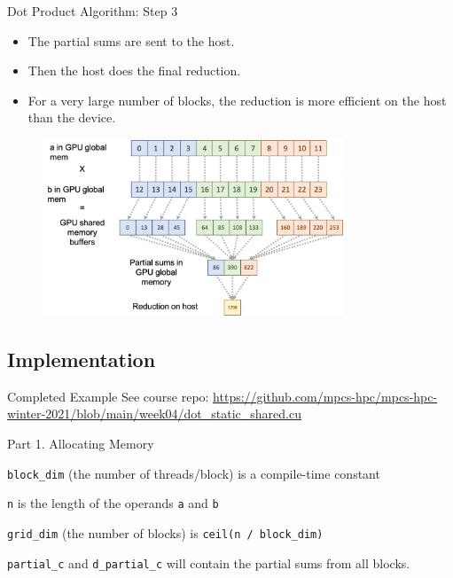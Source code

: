 \documentclass{beamer}
\begin{document}
    \begin{frame}{Dot Product Algorithm: Step 3}
        \begin{itemize}
            \item The partial sums are sent to the host.
            \item Then the host does the final reduction.
            \item For a very large number of blocks, the reduction is more efficient on the host than the device.
        \end{itemize}
        \begin{figure}
            \centering
            \includegraphics[width=0.8\textwidth]{img/04/dot-03.png}
        \end{figure}
    \end{frame}
    
    \subsection{Implementation}

    \begin{frame}{Completed Example}
        See course repo:  \url{https://github.com/mpcs-hpc/mpcs-hpc-winter-2021/blob/main/week04/dot_static_shared.cu}
    \end{frame}

    \begin{frame}{Part 1. Allocating Memory}
            \begin{itemize}
            {\footnotesize
                \item \texttt{block\_dim} (the number of threads/block) is a compile-time constant
                \item \texttt{n} is the length of the operands \texttt{a} and \texttt{b}
                \item \texttt{grid\_dim} (the number of blocks) is \texttt{ceil(n / block\_dim)}
                \item \texttt{partial\_c} and \texttt{d\_partial\_c} will contain the partial sums from all blocks.
            }
            \end{itemize}
            \begin{block}{}
                \inputminted[fontsize=\footnotesize]{cuda}{src/dot_snippet_01.cu}
            \end{block}
    \end{frame}
\end{document}
